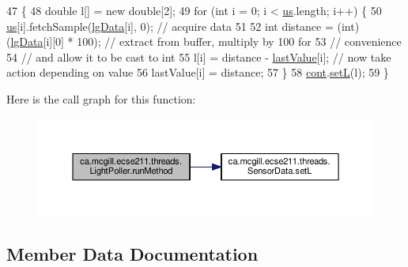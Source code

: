 \begin{DoxyCode}
47                              \{
48     \textcolor{keywordtype}{double} l[] = \textcolor{keyword}{new} \textcolor{keywordtype}{double}[2];
49     \textcolor{keywordflow}{for} (\textcolor{keywordtype}{int} i = 0; i < \hyperlink{classca_1_1mcgill_1_1ecse211_1_1threads_1_1_light_poller_ab6a9cb770bbf71f586697633db1475ff}{us}.length; i++) \{
50       \hyperlink{classca_1_1mcgill_1_1ecse211_1_1threads_1_1_light_poller_ab6a9cb770bbf71f586697633db1475ff}{us}[i].fetchSample(\hyperlink{classca_1_1mcgill_1_1ecse211_1_1threads_1_1_light_poller_a6cf53aecc3efc481f71d36341d2276c6}{lgData}[i], 0); \textcolor{comment}{// acquire data}
51 
52       \textcolor{keywordtype}{int} distance = (int) (\hyperlink{classca_1_1mcgill_1_1ecse211_1_1threads_1_1_light_poller_a6cf53aecc3efc481f71d36341d2276c6}{lgData}[i][0] * 100); \textcolor{comment}{// extract from buffer, multiply by 100 for}
53                                                  \textcolor{comment}{// convenience}
54       \textcolor{comment}{// and allow it to be cast to int}
55       l[i] = distance - \hyperlink{classca_1_1mcgill_1_1ecse211_1_1threads_1_1_light_poller_a79908bf56395ae82ab5ac57b5b40f206}{lastValue}[i]; \textcolor{comment}{// now take action depending on value}
56       lastValue[i] = distance;
57     \}
58     \hyperlink{classca_1_1mcgill_1_1ecse211_1_1threads_1_1_light_poller_ab6a9050ced4f6940add4735c8872194a}{cont}.\hyperlink{classca_1_1mcgill_1_1ecse211_1_1threads_1_1_sensor_data_af905a6f2825716ae1a39bf7f6be09477}{setL}(l);
59   \}
\end{DoxyCode}
Here is the call graph for this function\+:\nopagebreak
\begin{figure}[H]
\begin{center}
\leavevmode
\includegraphics[width=350pt]{classca_1_1mcgill_1_1ecse211_1_1threads_1_1_light_poller_aab90a460a4d0c926fb8f3930492a8fb1_cgraph}
\end{center}
\end{figure}


\subsection{Member Data Documentation}
\mbox{\label{classca_1_1mcgill_1_1ecse211_1_1threads_1_1_light_poller_ab6a9050ced4f6940add4735c8872194a}} 
